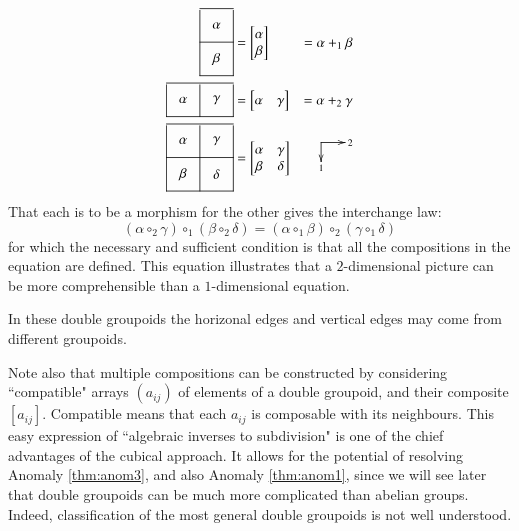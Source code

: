 \documentclass{elsarticle}
\makeatletter
\newcommand{\directs}[2]{\def\objectstyle{\scriptstyle}  \objectmargin={0pt}
\xy
(0,4)*+{}="a",(0,-2)*+{\rule{0em}{1.5ex}#2}="b",(7,4)*+{\;#1}="c"
\ar@{->} "a";"b" \ar @{->}"a";"c" \endxy }
\def\xybiglabels{\def\labelstyle{\textstyle}}
\makeatother
\begin{document}
\begin{alignat*}{3}
\xybiglabels \vcenter{\xymatrix@M=0pt{\ar@{-} [dd]\ar@{} [dr]|\alpha \ar@{-} [r] & \ar@{-} [dd] \\
\ar@{-} [r]\ar@{} [dr]|\beta& \\
\ar@{-} [r]& }}
&=
\begin{bmatrix}
  \alpha \\\beta
\end{bmatrix}& = \alpha+_1 \beta \\
\xybiglabels \vcenter{\xymatrix@M=0pt{\ar@{-} [d]\ar@{} [dr]|\alpha \ar@{-} [rr] &\ar@{} [dr]|\gamma \ar@{-} [d]& \ar@{-} [d]  \\
\ar@{-} [rr]&&  }} &= \begin{bmatrix}
  \alpha& \gamma
\end{bmatrix}& = \alpha+_2 \gamma \\
\xybiglabels \vcenter{\xymatrix@M=0pt{\ar@{-} [dd]\ar@{} [dr]|\alpha \ar@{-} [rr] & \ar@{} [dr]|\gamma\ar@{-} [dd]& \ar@{-}[dd]  \\
\ar@{-} [rr]\ar@{} [dr]|\beta&\ar@{} [dr]|\delta & \\
\ar@{-} [rr]&& }}  &= \begin{bmatrix}
\alpha & \gamma\\ \beta & \delta
\end{bmatrix} &\directs{2}{1}
\end{alignat*}
That each is to be a morphism for the other gives the interchange law:
 \begin{equation}\label{equ:interchange}  (\alpha\circ_2 \gamma)\circ_1(\beta\circ_2\delta)=
(\alpha\circ_1\beta)\circ_2(\gamma\circ_1\delta)
\end{equation}
\noindent for which the necessary and sufficient condition is that all the compositions in the equation are defined.  This equation illustrates  that a $2$-dimensional picture can be more comprehensible than a $1$-dimensional equation.

In these double groupoids the horizonal edges and vertical edges may come from different groupoids.

Note also that multiple compositions can be constructed  by considering ``compatible" arrays $(a_{ij}) $ of elements of a double groupoid, and their composite $[a_{ij}]$. Compatible means that each
$a_{ij}$ is composable with its neighbours.
 This easy expression of ``algebraic
inverses to subdivision" is one of the chief advantages of the cubical approach. It allows for the
potential of resolving Anomaly \ref{thm:anom3}, and also Anomaly \ref{thm:anom1}, since we will see later that double
groupoids can be much more complicated than abelian groups.  Indeed, classification of the
most general double groupoids is not well understood.
\end{document}
